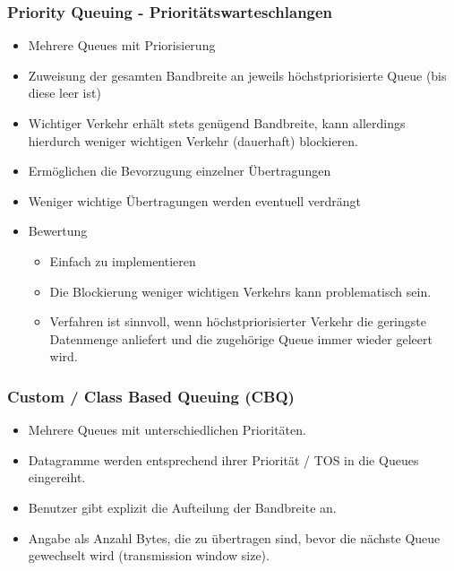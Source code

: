 \documentclass{article} %
\begin{document}
\subsubsection{Priority Queuing - Prioritätswarteschlangen}
	\begin{itemize}
	\item Mehrere Queues mit Priorisierung
	\item Zuweisung der gesamten Bandbreite an jeweils höchstpriorisierte Queue (bis diese leer ist)
	\item Wichtiger Verkehr erhält stets genügend Bandbreite, kann allerdings hierdurch weniger wichtigen Verkehr (dauerhaft) blockieren. 
	\item Ermöglichen die Bevorzugung einzelner Übertragungen
	\item Weniger wichtige Übertragungen werden eventuell verdrängt
	\item Bewertung
		\begin{itemize}
		\item Einfach zu implementieren
		\item Die Blockierung weniger wichtigen Verkehrs kann problematisch sein.
		\item Verfahren ist sinnvoll, wenn höchstpriorisierter Verkehr die geringste Datenmenge anliefert und die zugehörige Queue immer wieder geleert wird.
		\end{itemize}
	\end{itemize}
\subsubsection{Custom / Class Based Queuing (CBQ)}
	\begin{itemize}
	\item Mehrere Queues mit unterschiedlichen Prioritäten. 
	\item Datagramme werden entsprechend ihrer Priorität / TOS in die Queues eingereiht. 
	\item Benutzer gibt explizit die Aufteilung der Bandbreite an. 
	\item Angabe als Anzahl Bytes, die zu übertragen sind, bevor die 
	nächste Queue gewechselt wird (transmission window size). 
	\end{itemize}
\end{document}

